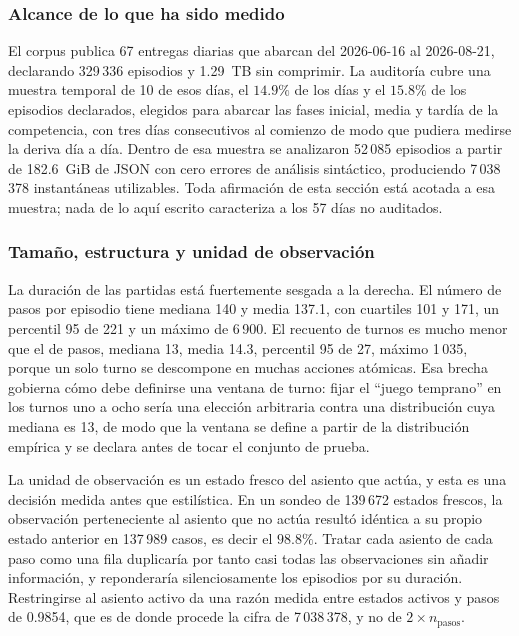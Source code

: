 \documentclass[conference]{IEEEtran}
\begin{document}
\subsubsection{Alcance de lo que ha sido medido}
El corpus publica 67 entregas diarias que abarcan del 2026-06-16 al
2026-08-21, declarando 329\,336 episodios y 1.29~TB sin comprimir. La
auditor\'ia cubre una muestra temporal de 10 de esos d\'ias, el
$14.9\%$ de los d\'ias y el $15.8\%$ de los episodios declarados, 
elegidos para abarcar las fases inicial, media y tard\'ia de la competencia,
con tres d\'ias consecutivos al comienzo de modo que pudiera medirse la
deriva d\'ia a d\'ia. Dentro de esa muestra se analizaron 52\,085 episodios
a partir de 182.6~GiB de JSON con cero errores de an\'alisis sint\'actico,
produciendo 7\,038\,378 instant\'aneas utilizables. Toda afirmaci\'on de
esta secci\'on est\'a acotada a esa muestra; nada de lo aqu\'i escrito
caracteriza a los 57 d\'ias no auditados.

\subsubsection{Tama\~no, estructura y unidad de observaci\'on}
La duraci\'on de las partidas est\'a fuertemente sesgada a la derecha. El
n\'umero de pasos por episodio tiene mediana 140 y media 137.1, con
cuartiles 101 y 171, un percentil 95 de 221 y un m\'aximo de 6\,900. El
recuento de turnos es mucho menor que el de pasos, mediana 13, media
14.3, percentil 95 de 27, m\'aximo 1\,035, porque un solo turno se
descompone en muchas acciones at\'omicas. Esa brecha gobierna c\'omo debe
definirse una ventana de turno: fijar el ``juego temprano'' en los turnos
uno a ocho ser\'ia una elecci\'on arbitraria contra una distribuci\'on cuya
mediana es 13, de modo que la ventana se define a partir de la
distribuci\'on emp\'irica y se declara antes de tocar el conjunto de prueba.

La unidad de observaci\'on es un estado fresco del asiento que act\'ua, y
esta es una decisi\'on medida antes que estil\'istica. En un sondeo de
139\,672 estados frescos, la observaci\'on perteneciente al asiento que no
act\'ua result\'o id\'entica a su propio estado anterior en 137\,989 casos,
es decir el $98.8\%$. Tratar cada asiento de cada paso como una fila
duplicar\'ia por tanto casi todas las observaciones sin a\~nadir
informaci\'on, y reponderar\'ia silenciosamente los episodios por su
duraci\'on. Restringirse al asiento activo da una raz\'on medida entre
estados activos y pasos de 0.9854, que es de donde procede la cifra de
7\,038\,378, y no de $2 \times n_{\text{pasos}}$.
\end{document}
